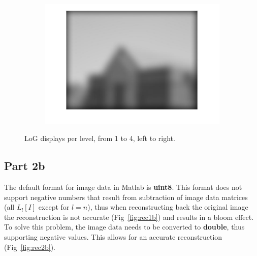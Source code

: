 \documentclass[a4paper]{iacas}
\begin{document}
\begin{figure}[!htbp]
\begin{subfigure}[b]{0.23\textwidth}
		\caption{}
		\label{fig:LoG3}
	\end{subfigure}
	\begin{subfigure}[b]{0.23\textwidth}
		\includegraphics[width=\textwidth]{LoG4.jpg}
		\caption{}
		\label{fig:LoG4}
	\end{subfigure}
	
	\caption{LoG displays per level, from 1 to 4, left to right.}
	\label{fig:LoG}
\end{figure}

\subsection{Part 2b}

The default format for image data in Matlab is \textbf{uint8}. This format does not support negative numbers that result from subtraction of image data matrices (all $L_l[I]$ except for $l=n$), thus when reconstructing back the original image the reconstruction is not accurate (Fig~\ref{fig:rec1b}) and results in a bloom effect. To solve this problem, the image data needs to be converted to \textbf{double}, thus supporting negative values. This allows for an accurate reconstruction (Fig~\ref{fig:rec2b}).
\end{document}
